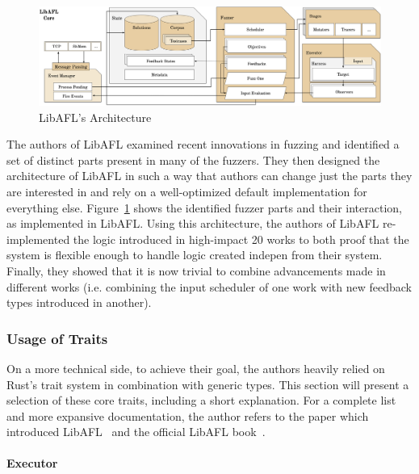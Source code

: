 \documentclass{article}
\let\savedCite=\cite
\renewcommand{\cite}{\unskip~\savedCite}
\let\savedRef=\ref
\renewcommand{\ref}{\unskip~\savedRef}
\begin{document}
\begin{figure}[htbp]
    \centering
    \includegraphics[width=\textwidth]{assets/LibAFLArchitecture.png}
    \caption{LibAFL's Architecture\cite{LibAFL}}
    \label{fig:LibAFLArchitecture}
\end{figure}
\begin{multicols}{2}

    The authors of LibAFL examined recent innovations in fuzzing and identified a set of distinct parts present in many of the fuzzers. They then designed the architecture of LibAFL in such a way that authors can change just the parts they are interested in and rely on a well-optimized default implementation for everything else. Figure\ref{fig:LibAFLArchitecture} shows the identified fuzzer parts and their interaction, as implemented in LibAFL. Using this architecture, the authors of LibAFL re-implemented the logic introduced in high-impact 20 works to both proof that the system is flexible enough to handle logic created indepen from their system. Finally, they showed that it is now trivial to combine advancements made in different works (i.e. combining the input scheduler of one work with new feedback types introduced in another).

    \subsubsection{Usage of Traits}
    \label{LibAFLTraits}

    On a more technical side, to achieve their goal, the authors heavily relied on Rust's trait system in combination with generic types. This section will present a selection of these core traits, including a short explanation. For a complete list and more expansive documentation, the author refers to the paper which introduced LibAFL\cite{LibAFL} and the official LibAFL book\cite{LibAFLBook}.

    \paragraph{Executor}


\end{multicols}
\end{document}
